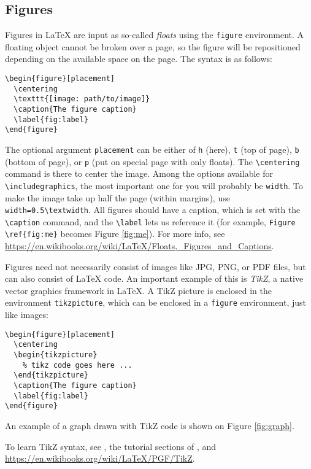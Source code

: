 \subsection{Figures}
\label{sec:figures}

Figures in \LaTeX{} are input as so-called \emph{floats} using the \texttt{figure} environment.
A floating object cannot be broken over a page, so the figure will be repositioned depending on the available space on the page.
The syntax is as follows:
%
\begin{verbatim}
\begin{figure}[placement]
  \centering
  \texttt{[image: path/to/image]}
  \caption{The figure caption}
  \label{fig:label}
\end{figure}
\end{verbatim}
%
The optional argument \texttt{placement} can be either of \texttt{h} (here), \texttt{t} (top of page), \texttt{b} (bottom of page), or \texttt{p} (put on special page with only floats).
The \verb!\centering! command is there to center the image.
Among the options available for \verb!\includegraphics!, the most important one for you will probably be \texttt{width}.
To make the image take up half the page (within margins), use \verb!width=0.5\textwidth!.
All figures should have a caption, which is set with the \verb!\caption! command, and the \verb!\label! lets us reference it (for example, \verb!Figure \ref{fig:me}! becomes Figure \ref{fig:me}).
For more info, see \url{https://en.wikibooks.org/wiki/LaTeX/Floats,_Figures_and_Captions}.



Figures need not necessarily consist of images like JPG, PNG, or PDF files, but can also consist of \LaTeX{} code.
An important example of this is \emph{TikZ}, a native vector graphics framework in \LaTeX{}.
A TikZ picture is enclosed in the environment \texttt{tikzpicture}, which can be enclosed in a \texttt{figure} environment, just like images:
%
\begin{verbatim}
\begin{figure}[placement]
  \centering
  \begin{tikzpicture}
    % tikz code goes here ...
  \end{tikzpicture}
  \caption{The figure caption}
  \label{fig:label}
\end{figure}
\end{verbatim}
%
An example of a graph drawn with TikZ code is shown on Figure \ref{fig:graph}.



To learn TikZ syntax, see \citep{minimaltikz}, the tutorial sections of \citep{tikzmanual}, and \url{https://en.wikibooks.org/wiki/LaTeX/PGF/TikZ}.